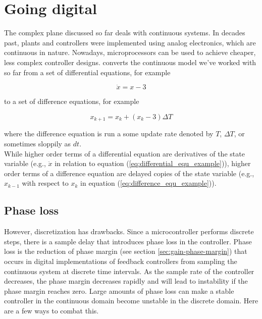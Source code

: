 \section{Going digital}

The complex plane discussed so far deals with continuous \glspl{system}. In
decades past, \glspl{plant} and controllers were implemented using analog
electronics, which are continuous in nature. Nowadays, microprocessors can be
used to achieve cheaper, less complex controller designs.
 converts the continuous model we've
worked with so far from a set of differential equations, for example

\begin{equation}
  \dot{x} = x - 3 \label{eq:differential_equ_example}
\end{equation}

to a set of difference equations, for example

\begin{equation}
  x_{k+1} = x_k + (x_k - 3) \Delta T \label{eq:difference_equ_example}
\end{equation}

where the difference equation is run a some update rate denoted by $T$,
$\Delta T$, or sometimes sloppily as $dt$. \\

While higher order terms of a differential equation are derivatives of the state
variable (e.g., $\ddot{x}$ in relation to equation
(\ref{eq:differential_equ_example})), higher order terms of a difference
equation are delayed copies of the state variable (e.g., $x_{k-1}$ with respect
to $x_k$ in equation (\ref{eq:difference_equ_example})).

\subsection{Phase loss}

However, \gls{discretization} has drawbacks. Since a microcontroller performs
discrete steps, there is a sample delay that introduces phase loss in the
controller. Phase loss is the reduction of phase margin (see section
\ref{sec:gain-phase-margin}) that occurs in digital implementations of feedback
controllers from sampling the continuous system at discrete time intervals. As
the sample rate of the controller decreases, the phase margin decreases rapidly
and will lead to instability if the phase margin reaches zero. Large amounts of
phase loss can make a stable controller in the continuous domain become unstable
in the discrete domain. Here are a few ways to combat this.

